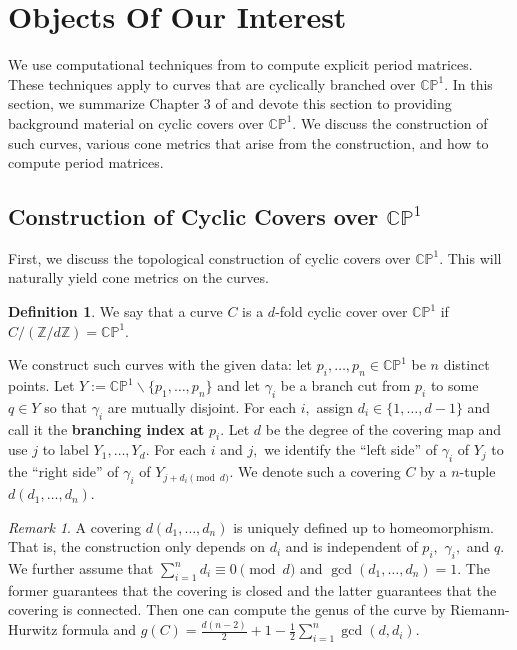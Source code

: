 \documentclass[12pt,reqno]{amsart}
\newcommand{\Z}{\mathbb{Z}}
\theoremstyle{definition}
\newtheorem{defn}{Definition}
\theoremstyle{remark}
\newtheorem*{remark}{Remark}
\begin{document}
\section{Objects Of Our Interest}
\label{sec: dthesis}
We use computational techniques from \cite{dthesis} to compute explicit period matrices. These techniques apply to curves that are cyclically branched over $\mathbb{C}\mathbb{P}^1.$ In this section, we summarize Chapter 3 of \cite{dthesis} and devote this section to providing background material on cyclic covers over $\mathbb{C}\mathbb{P}^1.$ We discuss the construction of such curves, various cone metrics that arise from the construction, and how to compute period matrices. 

\subsection{Construction of Cyclic Covers over $\mathbb{C}\mathbb{P}^1$}
First, we discuss the topological construction of cyclic covers over $\mathbb{C}\mathbb{P}^1.$ This will naturally yield cone metrics on the curves.

\begin{defn} We say that a curve $C$ is a $d$-fold cyclic cover over $\mathbb{C}\mathbb{P}^1$ if $C / (\Z/ d \Z) = \mathbb{C}\mathbb{P}^1.$ \end{defn}

We construct such curves with the given data: let $p_i, \ldots , p_n \in \mathbb{C}\mathbb{P}^1$ be $n$ distinct points. Let $Y := \mathbb{C}\mathbb{P}^1 \backslash \{p_1, \ldots, p_n\}$ and let $\gamma_i$ be a branch cut from $p_i$ to some $q \in Y$ so that $\gamma_i$ are mutually disjoint. For each $i,$ assign $d_i \in \{1, \ldots, d - 1\}$ and call it the \textbf{branching index at} $p_i.$ Let $d$ be the degree of the covering map and use $j$ to label $Y_1, \ldots , Y_d.$ For each $i$ and $j,$ we identify the ``left side'' of $\gamma_i$ of $Y_j$ to the ``right side'' of $\gamma_i$ of $Y_{j + d_i \pmod d}.$ We denote such a covering $C$ by a $n$-tuple $d (d_1, \ldots , d_n).$

\begin{remark} A covering $d (d_1, \ldots , d_n)$ is uniquely defined up to homeomorphism. That is, the construction only depends on $d_i$ and is independent of $p_i,$ $\gamma_i,$ and $q.$ We further assume that $\sum\limits_{i=1}^n d_i \equiv 0 \pmod d$ and $\gcd (d_1, \ldots, d_n) = 1.$ The former guarantees that the covering is closed and the latter guarantees that the covering is connected. Then one can compute the genus of the curve by Riemann-Hurwitz formula and $g(C) = \frac{d (n-2)}{2} + 1 - \frac{1}{2} \sum\limits_{i=1}^n \gcd(d,d_i).$ 
\end{remark}
\end{document}
